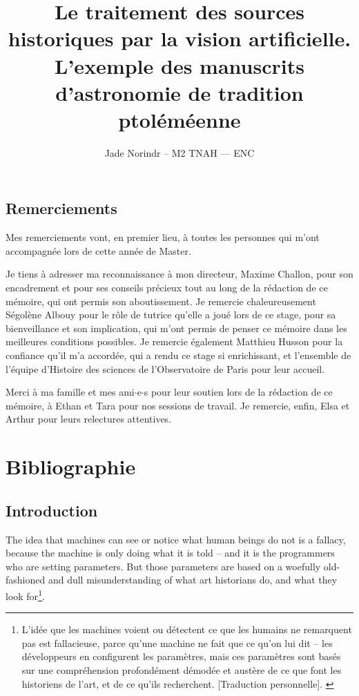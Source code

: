 \documentclass[a4paper,12pt,twoside]{book}
\author{Jade Norindr – M2 TNAH — ENC}
\title{Le traitement des sources historiques par la vision artificielle. L'exemple des manuscrits d'astronomie de tradition ptoléméenne}
\newcommand{\clearemptydoublepage}{\newpage{\pagestyle{empty}\cleardoublepage}}
\newcommand\chapterNo[1]{
  \chapter*{#1}
  \markright{\MakeUppercase{#1}}
}
\begin{document}
\onehalfspacing
\frontmatter

    

    \thispagestyle{empty}	
    \cleardoublepage
	
    
	
    \chapterNo{Remerciements}
    
    Mes remerciements vont, en premier lieu, à toutes les personnes qui m'ont accompagnée lors de cette année de Master.
    
    Je tiens à adresser ma reconnaissance à mon directeur, Maxime Challon, pour son encadrement et pour ses conseils précieux tout au long de la rédaction de ce mémoire, qui ont permis son aboutissement. Je remercie chaleureusement Ségolène Albouy pour le rôle de tutrice qu'elle a joué lors de ce stage, pour sa bienveillance et son implication, qui m'ont permis de penser ce mémoire dans les meilleures conditions possibles. Je remercie également Matthieu Husson pour la confiance qu'il m'a accordée, qui a rendu ce stage si enrichissant, et l'ensemble de l'équipe d'Histoire des sciences de l'Observatoire de Paris pour leur accueil.
    
    Merci à ma famille et mes ami$\cdot$e$\cdot$s pour leur soutien lors de la rédaction de ce mémoire, à Ethan et Tara pour nos sessions de travail. Je remercie, enfin, Elsa et Arthur pour leurs relectures attentives.
	
	\part*{Bibliographie}
    \printbibliography[keyword={DH},title={Humanités numériques}]
    \clearemptydoublepage
    \printbibliography[keyword={ml},title={\textit{Machine learning}, \textit{deep learning} et vision artificielle}]
    \clearemptydoublepage
    \printbibliography[keyword={technique},title={Documentation technique et méthode}]
    \clearemptydoublepage
    \printbibliography[keyword={astronomie},title={Histoire de l'astronomie}]
    \clearemptydoublepage
    
    \chapterNo{Introduction}
    \begin{displayquote}
    	The idea that machines can see or notice what human beings do not is a fallacy, because the machine is only doing what it is told – and it is the programmers who are setting parameters. But those parameters are based on a woefully old-fashioned and dull misunderstanding of what art historians do, and what they look for\footnote{\og L'idée que les machines voient ou détectent ce que les humains ne remarquent pas est fallacieuse, parce qu'une machine ne fait que ce qu'on lui dit -- les développeurs en configurent les paramètres, mais ces paramètres sont basés sur une compréhension profondément démodée et austère de ce que font les historiens de l'art, et de ce qu'ils recherchent. [Traduction personnelle]\fg. \cite{pollockComputersCanFind2014}}.
    \end{displayquote}
\end{document}
